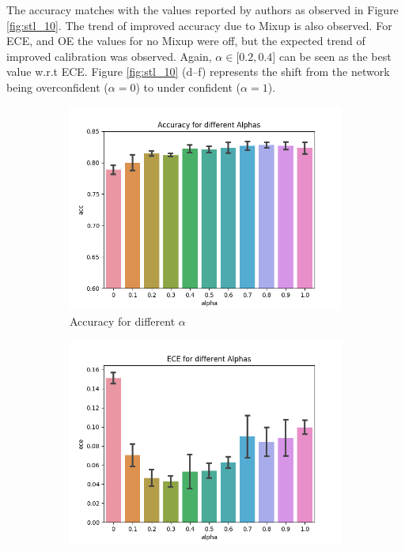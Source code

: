 The accuracy matches with the values reported by authors as observed in Figure \ref{fig:stl_10}. The trend of improved accuracy due to Mixup is also observed. For ECE, and OE the values for no Mixup were off, but the expected trend of improved calibration was observed. Again, $\alpha \in \lbrack 0.2, 0.4 \rbrack $ can be seen as the best value w.r.t ECE. Figure \ref{fig:stl_10} (d--f) represents the shift from the network being overconfident ($\alpha=0$) to under confident ($\alpha=1$). 

\begin{figure}[h]
     \centering
     \begin{subfigure}[b]{0.31\textwidth}
         \centering
         \includegraphics[width=\textwidth]{images/stl10/accuracyValpha.png}
         \caption{Accuracy for different $\alpha$}
     \end{subfigure}
     \begin{subfigure}[b]{0.31\textwidth}
         \centering
         \includegraphics[width=\textwidth]{images/stl10/eceValpha.png}

\end{subfigure}
\end{figure}

